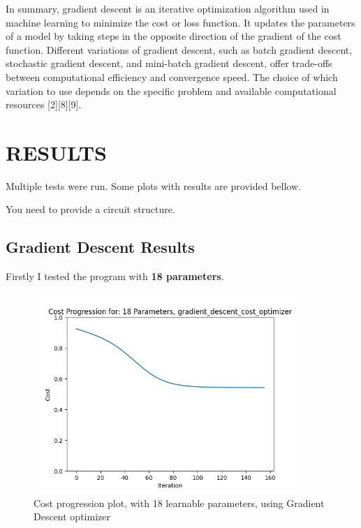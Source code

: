 \documentclass[inscr,ack,preface]{diphdthesis}
\begin{document}
In summary, gradient descent is an iterative optimization algorithm used in machine learning to minimize the cost or loss function. It updates the parameters of a model by taking steps in the opposite direction of the gradient of the cost function. Different variations of gradient descent, such as batch gradient descent, stochastic gradient descent, and mini-batch gradient descent, offer trade-offs between computational efficiency and convergence speed. The choice of which variation to use depends on the specific problem and available computational resources [2][8][9].

\chapter{RESULTS}
Multiple tests were run. Some plots with results are provided bellow.

You need to provide a circuit structure.

\section{Gradient Descent Results}

Firstly I tested the program with \textbf{18 parameters}.\\

\begin{figure}[ht]
\begin{center}
    \includegraphics[width=0.9\textwidth]{plots/18.png}
    \caption{Cost progression plot, with 18 learnable parameters, using Gradient Descent optimizer} 
    \label{fig:enter-label}
    \end{center}
\end{figure}
\end{document}
